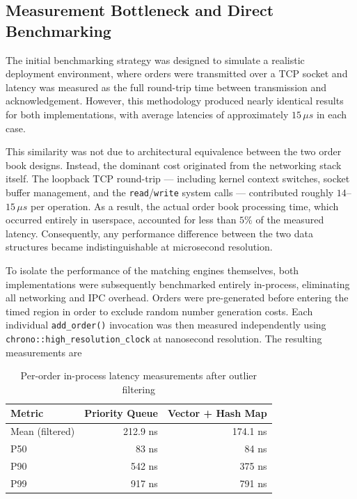 \documentclass{article}
\begin{document}
\subsection{Measurement Bottleneck and Direct Benchmarking}

The initial benchmarking strategy was designed to simulate a realistic deployment environment, where orders were transmitted over a TCP socket and latency was measured as the full round-trip time between transmission and acknowledgement. However, this methodology produced nearly identical results for both implementations, with average latencies of approximately $15\,\mu s$ in each case.

This similarity was not due to architectural equivalence between the two order book designs. Instead, the dominant cost originated from the networking stack itself. The loopback TCP round-trip --- including kernel context switches, socket buffer management, and the \texttt{read}/\texttt{write} system calls --- contributed roughly $14$--$15\,\mu s$ per operation. As a result, the actual order book processing time, which occurred entirely in userspace, accounted for less than $5\%$ of the measured latency. Consequently, any performance difference between the two data structures became indistinguishable at microsecond resolution.

To isolate the performance of the matching engines themselves, both implementations were subsequently benchmarked entirely in-process, eliminating all networking and IPC overhead. Orders were pre-generated before entering the timed region in order to exclude random number generation costs. Each individual \texttt{add\_order()} invocation was then measured independently using \texttt{chrono::high\_resolution\_clock} at nanosecond resolution. The resulting measurements are

\begin{table}[h]
\centering
\begin{tabular}{lrr}
\hline
\textbf{Metric} & \textbf{Priority Queue} & \textbf{Vector + Hash Map} \\
\hline
Mean (filtered) & 212.9 ns & 174.1 ns \\
P50             & 83 ns    & 84 ns    \\
P90             & 542 ns   & 375 ns   \\
P99             & 917 ns   & 791 ns   \\
\hline
\end{tabular}
\caption{Per-order in-process latency measurements after outlier filtering}
\end{table}
\end{document}
